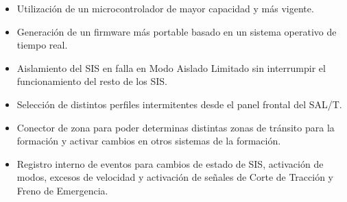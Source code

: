 \begin{itemize}
    \item Utilización de un microcontrolador de mayor capacidad y más vigente.
    \item Generación de un firmware más portable basado en un sistema operativo de tiempo real.
    \item Aislamiento del SIS en falla en Modo Aislado Limitado sin interrumpir el funcionamiento del resto de los SIS.
    \item Selección de distintos perfiles intermitentes desde el panel frontal del SAL/T.
    \item Conector de zona para poder determinas distintas zonas de tránsito para la formación y activar cambios en otros sistemas de la formación.
    \item Registro interno de eventos para cambios de estado de SIS, activación de modos, excesos de velocidad y activación de señales de Corte de Tracción y Freno de Emergencia.
\end{itemize}

